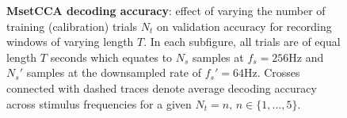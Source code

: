 \begin{figure}[htp]
\hfill
{}

\caption[\textbf{MsetCCA decoding accuracy}: effect of varying the number of training (calibration) trials $N_t$ on validation accuracy for recording windows of varying length $T$.]{\textbf{MsetCCA decoding accuracy}: effect of varying the number of training (calibration) trials $N_t$ on validation accuracy for recording windows of varying length $T$. In each subfigure, all trials are of equal length $T$ seconds which equates to $N_s$ samples at $f_s=256$Hz and $N_s'$ samples at the downsampled rate of $f_s'=64$Hz. Crosses connected with dashed traces denote average decoding accuracy across stimulus frequencies for a given $N_t=n, \, n\in\{1, \dots, 5\}$.}
\label{fig:mset-acc-nt}
\end{figure}

